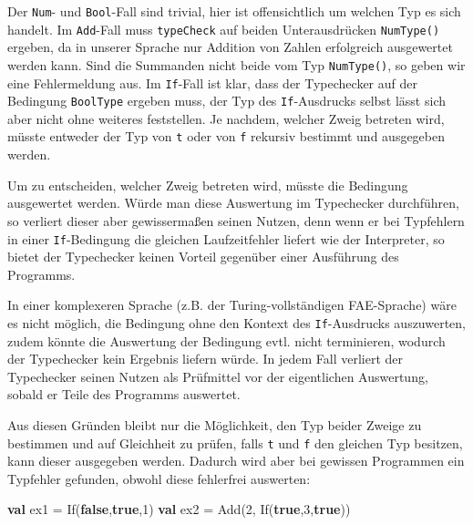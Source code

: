 \documentclass[]{article}
\newenvironment{Shaded}{}{}
\newcommand{\DecValTok}[1]{\textcolor[rgb]{0.25,0.63,0.44}{#1}}
\newcommand{\FunctionTok}[1]{\textcolor[rgb]{0.02,0.16,0.49}{#1}}
\newcommand{\KeywordTok}[1]{\textcolor[rgb]{0.00,0.44,0.13}{\textbf{#1}}}
\newcommand{\NormalTok}[1]{#1}
\begin{document}
Der \texttt{Num}- und \texttt{Bool}-Fall sind trivial, hier ist
offensichtlich um welchen Typ es sich handelt. Im \texttt{Add}-Fall muss
\texttt{typeCheck} auf beiden Unterausdrücken \texttt{NumType()}
ergeben, da in unserer Sprache nur Addition von Zahlen erfolgreich
ausgewertet werden kann. Sind die Summanden nicht beide vom Typ
\texttt{NumType()}, so geben wir eine Fehlermeldung aus. Im
\texttt{If}-Fall ist klar, dass der Typechecker auf der Bedingung
\texttt{BoolType} ergeben muss, der Typ des \texttt{If}-Ausdrucks selbst
lässt sich aber nicht ohne weiteres feststellen. Je nachdem, welcher
Zweig betreten wird, müsste entweder der Typ von \texttt{t} oder von
\texttt{f} rekursiv bestimmt und ausgegeben werden.

Um zu entscheiden, welcher Zweig betreten wird, müsste die Bedingung
ausgewertet werden. Würde man diese Auswertung im Typechecker
durchführen, so verliert dieser aber gewissermaßen seinen Nutzen, denn
wenn er bei Typfehlern in einer \texttt{If}-Bedingung die gleichen
Laufzeitfehler liefert wie der Interpreter, so bietet der Typechecker
keinen Vorteil gegenüber einer Ausführung des Programms.

In einer komplexeren Sprache (z.B. der Turing-vollständigen FAE-Sprache)
wäre es nicht möglich, die Bedingung ohne den Kontext des
\texttt{If}-Ausdrucks auszuwerten, zudem könnte die Auswertung der
Bedingung evtl. nicht terminieren, wodurch der Typechecker kein Ergebnis
liefern würde. In jedem Fall verliert der Typechecker seinen Nutzen als
Prüfmittel vor der eigentlichen Auswertung, sobald er Teile des
Programms auswertet.

Aus diesen Gründen bleibt nur die Möglichkeit, den Typ beider Zweige zu
bestimmen und auf Gleichheit zu prüfen, falls \texttt{t} und \texttt{f}
den gleichen Typ besitzen, kann dieser ausgegeben werden. Dadurch wird
aber bei gewissen Programmen ein Typfehler gefunden, obwohl diese
fehlerfrei auswerten:

\begin{Shaded}
\begin{Highlighting}[]
\KeywordTok{val}\NormalTok{ ex1 = }\FunctionTok{If}\NormalTok{(}\KeywordTok{false}\NormalTok{,}\KeywordTok{true}\NormalTok{,}\DecValTok{1}\NormalTok{)}
\KeywordTok{val}\NormalTok{ ex2 = }\FunctionTok{Add}\NormalTok{(}\DecValTok{2}\NormalTok{, }\FunctionTok{If}\NormalTok{(}\KeywordTok{true}\NormalTok{,}\DecValTok{3}\NormalTok{,}\KeywordTok{true}\NormalTok{))}
\end{Highlighting}
\end{Shaded}
\end{document}

